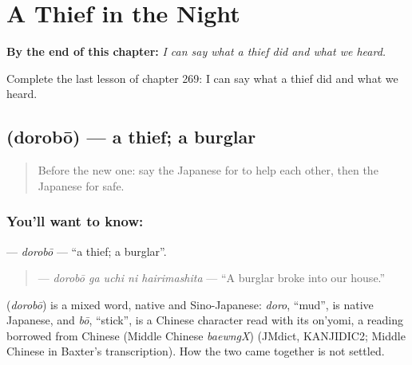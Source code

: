 
\chapter{A Thief in the Night}
\label{ch:ja-a-thief-in-the-night}

\begin{chapteropening}
\textbf{By the end of this chapter:} \emph{I can say what a thief did and what we heard.}

Complete the last lesson of chapter 269: I can say what a thief did and what we heard.
\end{chapteropening}

\section[\texorpdfstring{\ja{どろぼう} (dorobō)}{どろぼう (dorobō)}]{ (dorobō) — a thief; a burglar}

\label{lesson:JA-C269-dorobou}



\begin{quote}
Before the new one: say the Japanese for to help each other, then the Japanese for safe.
\end{quote}

\subsection*{You'll want to know: }
\textbf{} — \emph{dorobō} — \textquotedblleft{}a thief; a burglar\textquotedblright{}.

\begin{quote}
\textbf{  } — \emph{dorobō ga uchi ni hairimashita} — \textquotedblleft{}A burglar broke into our house.\textquotedblright{}
\end{quote}

\begin{cousinweb}
\textbf{} (\emph{dorobō}) is a mixed word, native and Sino-Japanese: \emph{doro}, \textquotedblleft{}mud\textquotedblright{}, is native Japanese, and \emph{bō}, \textquotedblleft{}stick\textquotedblright{}, is a Chinese character read with its on'yomi, a reading borrowed from Chinese (Middle Chinese \emph{baewngX}) (JMdict, KANJIDIC2; Middle Chinese in Baxter's transcription). How the two came together is not settled.
\end{cousinweb}


